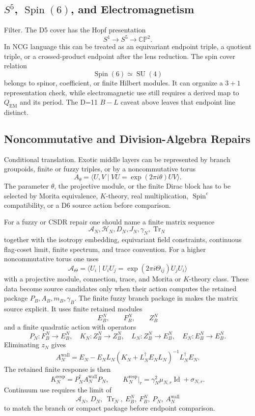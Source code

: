 \documentclass[11pt]{article}
\newcommand{\CP}{\mathbb{CP}}
\newcommand{\Tr}{\operatorname{Tr}}
\newcommand{\Id}{\operatorname{Id}}
\newcommand{\Spin}{\operatorname{Spin}}
\newcommand{\SU}{\operatorname{SU}}
\begin{document}
\subsection{\texorpdfstring{\(S^5\), \(\Spin(6)\), and Electromagnetism}{S5, Spin(6), and Electromagnetism}}

Filter.  The D5 cover has the Hopf presentation
\[
  S^1\longrightarrow S^5\longrightarrow \CP^2 .
\]
In NCG language this can be treated as an equivariant endpoint triple, a
quotient triple, or a crossed-product endpoint after the lens reduction.  The
spin cover relation
\[
  \Spin(6)\simeq \SU(4)
\]
belongs to spinor, coefficient, or finite Hilbert modules.  It can organize a
\(3+1\) representation check, while electromagnetic use still requires a
derived map to \(Q_{\mathrm{EM}}\) and its period.  The D=11 \(B-L\) caveat
above leaves that endpoint line distinct.

\subsection{Noncommutative and Division-Algebra Repairs}

Conditional translation.  Exotic middle layers can be represented by branch
groupoids, finite or fuzzy triples, or by a noncommutative torus
\[
  A_\theta=\langle U,V\mid VU=\exp(2\pi i\theta)UV\rangle .
\]
The parameter \(\theta\), the projective module, or the finite Dirac block has
to be selected by Morita equivalence, \(K\)-theory, real multiplication,
\(\Spin^c\) compatibility, or a D6 source action before comparison.

For a fuzzy or CSDR repair one should name a finite matrix sequence
\[
  \mathcal A_N,\mathcal H_N,D_N,J_N,\gamma_N,\Tr_N
\]
together with the isotropy embedding, equivariant field constraints,
continuous flag-coset limit, finite spectrum, and trace convention.  For a
higher noncommutative torus one uses
\[
  \mathcal A_\Theta
   =\langle U_i\mid U_iU_j=\exp(2\pi i\Theta_{ij})U_jU_i\rangle
\]
with a projective module, connection, trace, and Morita or \(K\)-theory
class.  These data become source candidates only when their action computes
the retained package \(P_B,A_B,m_B,\gamma_B\).
The finite fuzzy branch package in \cite{ncg-fuzzy-finite-package} makes the
matrix source explicit.  It uses finite retained modules
\[
  E_B^N,\qquad F_B^N,\qquad Z_B^N
\]
and a finite quadratic action with operators
\[
  P_N:F_B^N\to E_B^N,\quad
  K_N:Z_B^N\to Z_B^N,\quad
  L_N:Z_B^N\to E_B^N,\quad
  E_N:E_B^N\to E_B^N .
\]
Eliminating \(z_N\) gives
\[
  A_N^{\mathrm{wall}}
  =
    E_N
    -E_NL_N(K_N+L_N^\dagger E_NL_N)^{-1}L_N^\dagger E_N .
\]
The retained finite response is then
\[
  K_N^{\mathrm{resp}}=P_N^\dagger A_N^{\mathrm{wall}}P_N,\qquad
  K_N^{\mathrm{resp}}\vert_r
    =\gamma_N^2\mu_{N,r}\Id+\sigma_{N,r}.
\]
Continuum use requires the limit of
\[
  \mathcal A_N,\ D_N,\ \Tr_N,\ E_B^N,\ F_B^N,\ P_N,\ A_N^{\mathrm{wall}}
\]
to match the branch or compact package before endpoint comparison.
\end{document}
